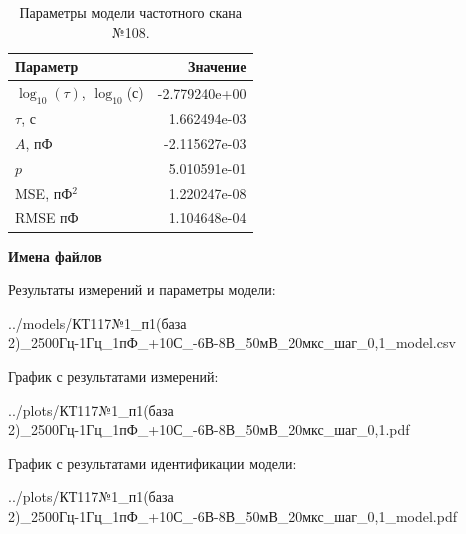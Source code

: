 \begin{table}[!ht]
    \centering
    \caption{Параметры модели частотного скана №108.}
    \begin{tabular}{|l|r|}
        \hline
        Параметр                                       & Значение                  \\ \hline
        $\log_{10}(\tau)$, $\log_{10}$(с)              & -2.779240e+00             \\ \hline
        $\tau$, с                                      & 1.662494e-03              \\ \hline
        $A$, пФ                                        & -2.115627e-03             \\ \hline
        $p$                                            & 5.010591e-01              \\ \hline
        MSE, пФ$^2$                                    & 1.220247e-08              \\ \hline
        RMSE пФ                                        & 1.104648e-04              \\ \hline
    \end{tabular}
    \label{table:frequency_scan_model_108}
\end{table}

\textbf{Имена файлов}

Результаты измерений и параметры модели:

\scriptsize../models/КТ117№1\_п1(база 2)\_2500Гц-1Гц\_1пФ\_+10С\_-6В-8В\_50мВ\_20мкс\_шаг\_0,1\_model.csv
\normalsize

График с результатами измерений:

\scriptsize../plots/КТ117№1\_п1(база 2)\_2500Гц-1Гц\_1пФ\_+10С\_-6В-8В\_50мВ\_20мкс\_шаг\_0,1.pdf
\normalsize

График с результатами идентификации модели:

\scriptsize../plots/КТ117№1\_п1(база 2)\_2500Гц-1Гц\_1пФ\_+10С\_-6В-8В\_50мВ\_20мкс\_шаг\_0,1\_model.pdf
\normalsize

